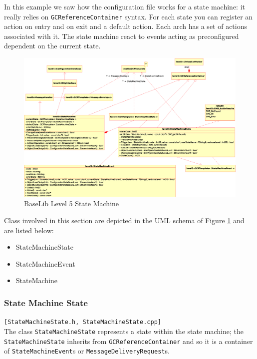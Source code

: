 In this example we saw how the configuration file works for a state machine: it really relies on \texttt{GCReferenceContainer} syntax. For each state you can register an action on entry and on exit and a default action. Each arch has a set of actions associated with it. The state machine react to events acting as preconfigured dependent on the current state.

\begin{figure}[h!]
 \begin{center}
  \includegraphics[width=\textwidth]{level5/level5-StateMachine.eps}
  \caption{BaseLib Level 5 State Machine}
  \label{f:level5:SM}
 \end{center}
\end{figure}

Class involved in this section are depicted in the UML schema of Figure \ref{f:level5:SM} and are listed below:
\begin{itemize}
 \item StateMachineState
 \item StateMachineEvent
 \item StateMachine
\end{itemize}



\subsubsection{State Machine State}
\texttt{[StateMachineState.h, StateMachineState.cpp]}\\
The class \texttt{StateMachineState} represents a state within the state machine; the \texttt{StateMachineState} inherits from \texttt{GCReferenceContainer} and so it is a container of \texttt{StateMachineEvent}s or \texttt{MessageDeliveryRequest}s.

